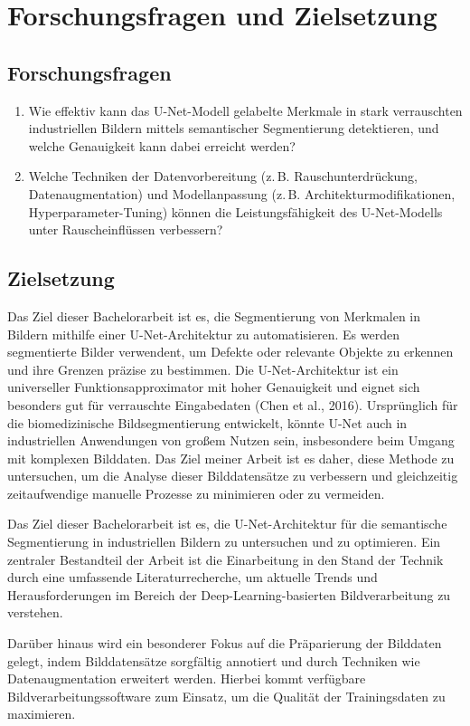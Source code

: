 \chapter{Forschungsfragen und Zielsetzung}\label{sec:exp_ziel}
\section{Forschungsfragen}
\begin{enumerate}
    \item Wie effektiv kann das U-Net-Modell gelabelte Merkmale in stark verrauschten industriellen Bildern mittels semantischer Segmentierung detektieren, und welche Genauigkeit kann dabei erreicht werden?
    \item Welche Techniken der Datenvorbereitung (z. B. Rauschunterdrückung, Datenaugmentation) und Modellanpassung (z. B. Architekturmodifikationen, Hyperparameter-Tuning) können die Leistungsfähigkeit des U-Net-Modells unter Rauscheinflüssen verbessern?
\end{enumerate}

\section{Zielsetzung}
Das Ziel dieser Bachelorarbeit ist es, die Segmentierung von Merkmalen in Bildern mithilfe einer U-Net-Architektur zu automatisieren. Es werden segmentierte Bilder verwendent, um Defekte oder relevante Objekte zu erkennen und ihre Grenzen präzise zu bestimmen. Die U-Net-Architektur ist ein universeller Funktionsapproximator mit hoher Genauigkeit und eignet sich besonders gut für verrauschte Eingabedaten (Chen et al., 2016). Ursprünglich für die biomedizinische Bildsegmentierung entwickelt, könnte U-Net auch in industriellen Anwendungen von großem Nutzen sein, insbesondere beim Umgang mit komplexen Bilddaten. Das Ziel meiner Arbeit ist es daher, diese Methode zu untersuchen, um die Analyse dieser Bilddatensätze zu verbessern und gleichzeitig zeitaufwendige manuelle Prozesse zu minimieren oder zu vermeiden.


Das Ziel dieser Bachelorarbeit ist es, die U-Net-Architektur für die semantische Segmentierung in industriellen Bildern zu untersuchen und zu optimieren. Ein zentraler Bestandteil der Arbeit ist die Einarbeitung in den Stand der Technik durch eine umfassende Literaturrecherche, um aktuelle Trends und Herausforderungen im Bereich der Deep-Learning-basierten Bildverarbeitung zu verstehen.

Darüber hinaus wird ein besonderer Fokus auf die Präparierung der Bilddaten gelegt, indem Bilddatensätze sorgfältig annotiert und durch Techniken wie Datenaugmentation erweitert werden. Hierbei kommt verfügbare Bildverarbeitungssoftware zum Einsatz, um die Qualität der Trainingsdaten zu maximieren.

